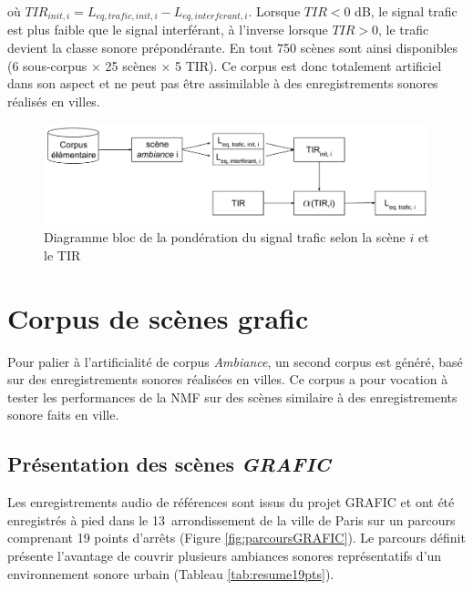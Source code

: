 où $TIR_{init,i} = L_{eq,trafic,init,i}-L_{eq,interferant,i}$. Lorsque $TIR < 0$ dB, le signal trafic est plus faible que le signal interférant, à l'inverse lorsque $TIR>0$, le trafic devient la classe sonore prépondérante. En tout 750 scènes sont ainsi disponibles (6 sous-corpus $\times$ 25 scènes $\times$ 5 TIR). Ce corpus est donc totalement artificiel dans son aspect et ne peut pas être assimilable à des enregistrements sonores réalisés en villes. \\

\begin{figure}[t]
\centering
\includegraphics[width=.9\linewidth]{./figures/autres/TIR_ambiance.pdf}
\caption{Diagramme bloc de la pondération du signal trafic selon la scène $i$ et le TIR}
\end{figure}

\section{Corpus de scènes grafic}

Pour palier à l'artificialité de corpus \textit{Ambiance}, un second corpus est généré, basé sur des enregistrements sonores réalisées en villes. Ce corpus a pour vocation à tester les performances de la NMF sur des scènes similaire à des enregistrements sonore faits en ville.

\subsection{Présentation des scènes \textit{GRAFIC}}

Les enregistrements audio de références sont issus du projet GRAFIC \cite{aumond2017modeling} et ont été enregistrés à pied dans le 13\ieme~arrondissement de la ville de Paris sur un parcours comprenant 19 points d'arrêts (Figure \ref{fig:parcoursGRAFIC}). Le parcours définit présente l'avantage de couvrir plusieurs ambiances sonores représentatifs d'un environnement sonore urbain (Tableau \ref{tab:resume19pts}).\\
 
